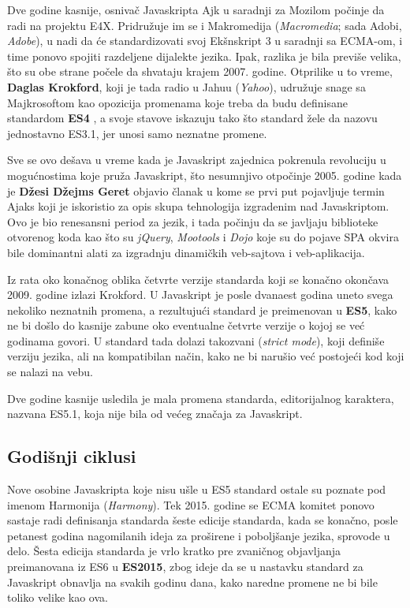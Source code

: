 Dve godine kasnije, osnivač Javaskripta Ajk u saradnji za Mozilom počinje da radi na projektu E4X.
Pridružuje im se i Makromedija (\textsl{Macromedia}; sada Adobi, \textsl{Adobe}), u nadi da će standardizovati svoj Ekšnskript 3 u saradnji sa ECMA-om, i time ponovo spojiti razdeljene dijalekte jezika.
Ipak, razlika je bila previše velika, što su obe strane počele da shvataju krajem 2007. godine.
Otprilike u to vreme, \textbf{Daglas Krokford}, koji je tada radio u Jahuu (\textsl{Yahoo}), udružuje snage sa Majkrosoftom kao opozicija promenama koje treba da budu definisane standardom \textbf{ES4} \cite{axel-rauschmayer:speaking}, a svoje stavove iskazuju tako što standard žele da nazovu jednostavno ES3.1, jer unosi samo neznatne promene.

Sve se ovo dešava u vreme kada je Javaskript zajednica pokrenula revoluciju u mogućnostima koje pruža Javaskript, što nesumnjivo otpočinje 2005. godine kada je \textbf{Džesi Džejms Geret} objavio članak u kome se prvi put pojavljuje termin Ajaks koji je iskoristio za opis skupa tehnologija izgradenim nad Javaskriptom.
Ovo je bio renesansni period za jezik, i tada počinju da se javljaju biblioteke otvorenog koda kao što su \textsl{jQuery}, \textsl{Mootools} i \textsl{Dojo} koje su do pojave SPA okvira bile dominantni alati za izgradnju dinamičkih veb-sajtova i veb-aplikacija.

Iz rata oko konačnog oblika četvrte verzije standarda koji se konačno okončava 2009. godine izlazi Krokford.
U Javaskript je posle dvanaest godina uneto svega nekoliko neznatnih promena, a rezultujući standard je preimenovan u \textbf{ES5}, kako ne bi došlo do kasnije zabune oko eventualne četvrte verzije o kojoj se već godinama govori.
U standard tada dolazi takozvani  (\textsl{strict mode}), koji definiše  verziju jezika, ali na kompatibilan način, kako ne bi narušio već postojeći kod koji se nalazi na vebu.

Dve godine kasnije usledila je mala promena standarda, editorijalnog karaktera, nazvana ES5.1, koja nije bila od većeg značaja za Javaskript.

\subsection{Godišnji ciklusi}

Nove osobine Javaskripta koje nisu ušle u ES5 standard ostale su poznate pod imenom Harmonija (\textsl{Harmony}).
Tek 2015. godine se ECMA komitet ponovo sastaje radi definisanja standarda šeste edicije standarda, kada se konačno, posle petanest godina nagomilanih ideja za proširene i poboljšanje jezika, sprovode u delo.
Šesta edicija standarda je vrlo kratko pre zvaničnog objavljanja preimanovana iz ES6 u \textbf{ES2015}, zbog ideje da se u nastavku standard za Javaskript obnavlja na svakih godinu dana, kako naredne promene ne bi bile toliko velike kao ova.

